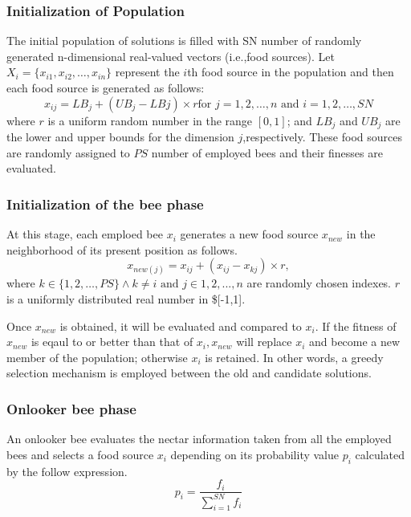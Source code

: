 \documentclass[pdftex,11pt]{article}
\begin{document}
\subsubsection{Initialization of Population}
The initial population of solutions is filled with SN number of randomly generated n-dimensional real-valued vectors (i.e.,food sources). Let $X_i = \{x_{i1},x_{i2},\dots,x_{in}\}$ represent the $i$th food source in the population and then each food source is generated as follows:
\begin{equation}
	x_{ij} = LB_j + (UB_j - LBj) \times r \text{for $j= 1,2,\dots,n$ and $i = 1,2,\dots,SN$}
\end{equation}
where $r$ is a uniform random number in the range $[0,1]$; and $LB_j$ and $UB_j$ are the lower and upper bounds for the dimension $j$,respectively. These food sources are randomly assigned to $PS$ number of employed bees and their finesses are evaluated.

\subsubsection{Initialization of the bee phase}
At this stage, each emploed bee $x_i$ generates a new food source $x_{new}$ in the neighborhood of its present position as follows.
\begin{equation}
\label{eq:3}
	x_{new(j)} = x_{ij} + (x_{ij} - x_{kj}) \times r,
\end{equation}
where $k \in \{1,2,\dots,PS\} \wedge k \neq i \text{ and } j \in {1,2,...,n}$ are randomly chosen indexes. $r$ is a uniformly distributed real number in \$[-1,1].

Once $x_{new}$ is obtained, it will be evaluated and compared to $x_i$. If the fitness of $x_{new}$ is eqaul to or better than that of $x_i,x_{new}$ will replace $x_i$ and become a new member of the population; otherwise $x_i$ is retained. In other words, a greedy selection mechanism is employed between the old and candidate solutions.

\subsubsection{Onlooker bee phase}
An onlooker bee evaluates the nectar information taken from all the employed bees and selects a food source $x_i$ depending on its probability value $p_i$ calculated by the follow expression.
\begin{equation}
	p_i = \frac{f_i}{\sum^{SN}_{i=1}f_i}
\end{equation}
\end{document}
